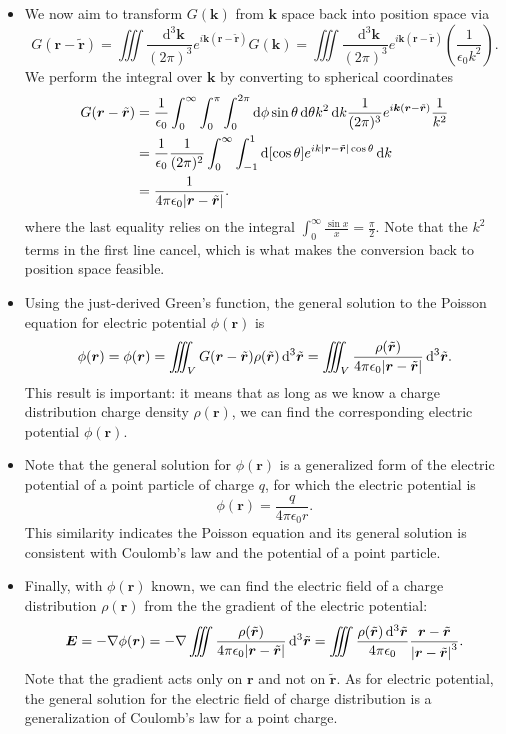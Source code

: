 \documentclass[11pt, a4paper]{article}
\newcommand{\diff}{\mathop{}\!\mathrm{d}} %
\newcommand{\dtr}{\diff^{3} \tilde{\r}}  %
\newcommand{\dk}{\diff^{3} \vec{k}}  %
\renewcommand{\vec}[1]{\bm{#1}} %
\renewcommand{\t}[1]{\tilde{#1}} %
\renewcommand{\r}{\vec{r}}
\renewcommand{\k}{\vec{k}}
\newcommand{\E}{\vec{E}} %
\newcommand{\ee}{\epsilon_{0}}  %
\renewcommand{\grad}{\nabla}
\begin{document}
\begin{itemize}
	\item We now aim to transform $ G(\k) $ from $ \k $ space back into position space via
	\begin{equation*}
		G(\r - \t{\r}) = \iiint \frac{\dk}{(2\pi)^{3}}e^{i\k(\r - \t{\r})}G(\k) = \iiint \frac{\dk}{(2\pi)^{3}}e^{i\k(\r - \t{\r})}\left(\frac{1}{\ee k^{2}}\right).
	\end{equation*}
	We perform the integral over $ \k $ by converting to spherical coordinates
	\begin{align*}
		G(\r - \t{\r}) &= \frac{1}{\ee}\int_{0}^{\infty} \int_{0}^{\pi} \int_{0}^{2\pi} \diff \phi \sin \theta \diff \theta k^{2} \diff k \frac{1}{(2\pi)^{3}}e^{i\k(\r - \t{\r})} \frac{1}{k^{2}} \\
		& = \frac{1}{\ee}\frac{1}{(2\pi)^{2}}\int_{0}^{\infty} \int_{-1}^{1} \diff [\cos \theta]  e^{ik\abs{\r - \t{\r}}\cos \theta} \diff k\\
		& = \frac{1}{4\pi \ee \abs{\r - \t{\r}}}.
	\end{align*}
	where the last equality relies on the integral $ \int_{0}^{\infty}\frac{\sin x}{x} = \frac{\pi}{2} $. Note that the $ k^{2} $ terms in the first line cancel, which is what makes the conversion back to position space feasible.
	
	\item  Using the just-derived Green's function, the general solution to the Poisson equation for electric potential $ \phi(\r) $  is
	\begin{equation*}
		\phi(\r) = \phi(\r) = \iiint_{V} G(\r - \t{\r})\rho(\t{\r}) \dtr = \iiint_{V} \frac{\rho(\t{\r})}{4\pi \ee \abs{\r - \t{\r}}}\dtr.
	\end{equation*}
	This result is important: it means that as long as we know a charge distribution charge density $ \rho(\r) $, we can find the corresponding electric potential $ \phi(\r) $. 
	
	\item Note that the general solution for $ \phi(\r) $ is a generalized form of the electric potential of a point particle of charge $ q $, for which the electric potential is
	\begin{equation*}
		\phi(\r) = \frac{q}{4\pi \ee r}.
	\end{equation*}
	This similarity indicates the Poisson equation and its general solution is consistent with Coulomb's law and the potential of a point particle.
	

	
	\item Finally, with $ \phi(\r) $ known, we can find the electric field of a charge distribution $ \rho(\r) $ from the the gradient of the electric potential:
	\begin{equation*}
		\E = - \grad \phi(\r) = - \grad \iiint \frac{\rho(\t{\r})}{4\pi \ee \abs{\r - \t{\r}}}\dtr = \iiint \frac{\rho(\t{\r})\dtr}{4\pi \ee} \frac{\r - \t{\r}}{\abs{\r - \t{\r}}^{3}}.
	\end{equation*}
	Note that the gradient acts only on $ \r $ and not on $ \t{\r} $. As for electric potential, the general solution for the electric field of charge distribution is a generalization of Coulomb's law for a point charge. 
\end{itemize}
\end{document}
